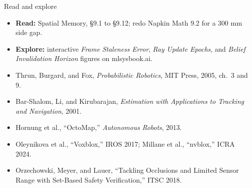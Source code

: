 \documentclass[aspectratio=169, 12pt]{beamer}
\begin{document}
\begin{frame}{Read and explore}
  \footnotesize
  \begin{itemize}\setlength{\itemsep}{0.05cm}
    \item \textbf{Read:} Spatial Memory, \S9.1 to \S9.12; redo Napkin Math 9.2 for a 300 mm side gap.
    \item \textbf{Explore:} interactive \emph{Frame Staleness Error}, \emph{Ray Update Epochs}, and \emph{Belief Invalidation Horizon} figures on mlsysbook.ai.
    \item Thrun, Burgard, and Fox, \textit{Probabilistic Robotics}, MIT Press, 2005, ch.\ 3 and 9.
    \item Bar-Shalom, Li, and Kirubarajan, \textit{Estimation with Applications to Tracking and Navigation}, 2001.
    \item Hornung et al., ``OctoMap,'' \textit{Autonomous Robots}, 2013.
    \item Oleynikova et al., ``Voxblox,'' IROS 2017; Millane et al., ``nvblox,'' ICRA 2024.
    \item Orzechowski, Meyer, and Lauer, ``Tackling Occlusions and Limited Sensor Range with Set-Based Safety Verification,'' ITSC 2018.
  \end{itemize}
\end{frame}
\end{document}
